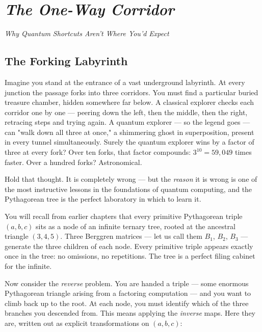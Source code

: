 \chapter{\textit{The One-Way Corridor}}
\begin{center}\large\itshape \textit{Why Quantum Shortcuts Aren't Where You'd Expect}\end{center}
\medskip
\label{ch07}




\bigskip


\section{The Forking Labyrinth}

Imagine you stand at the entrance of a vast underground labyrinth. At every junction the passage forks into three corridors. You must find a particular buried treasure chamber, hidden somewhere far below. A classical explorer checks each corridor one by one --- peering down the left, then the middle, then the right, retracing steps and trying again. A quantum explorer --- so the legend goes --- can "walk down all three at once," a shimmering ghost in superposition, present in every tunnel simultaneously. Surely the quantum explorer wins by a factor of three at every fork? Over ten forks, that factor compounds: $3^{10} = 59{,}049$ times faster. Over a hundred forks? Astronomical.

Hold that thought. It is completely wrong --- but the \textit{reason} it is wrong is one of the most instructive lessons in the foundations of quantum computing, and the Pythagorean tree is the perfect laboratory in which to learn it.

You will recall from earlier chapters that every primitive Pythagorean triple $(a, b, c)$ sits as a node of an infinite ternary tree, rooted at the ancestral triangle $(3, 4, 5)$. Three Berggren matrices --- let us call them $B_1$, $B_2$, $B_3$ --- generate the three children of each node. Every primitive triple appears exactly once in the tree: no omissions, no repetitions. The tree is a perfect filing cabinet for the infinite.

Now consider the \textit{reverse} problem. You are handed a triple --- some enormous Pythagorean triangle arising from a factoring computation --- and you want to climb back up to the root. At each node, you must identify which of the three branches you descended from. This means applying the \textit{inverse} maps. Here they are, written out as explicit transformations on $(a, b, c)$:

